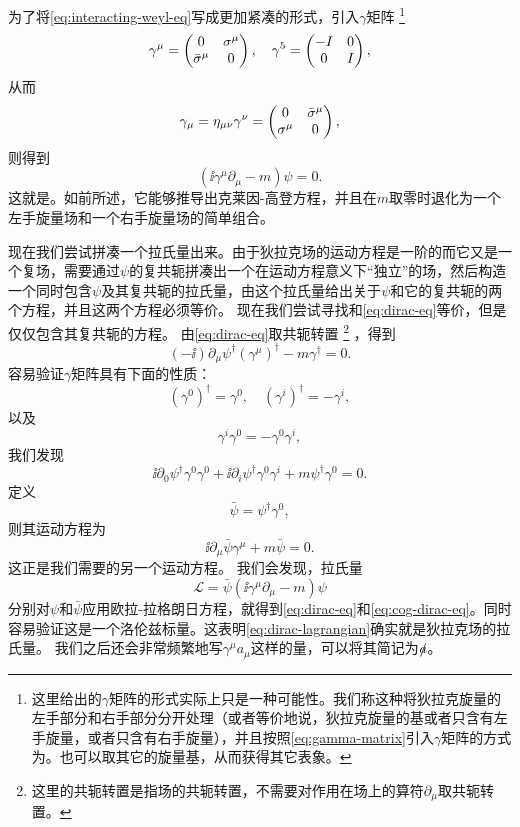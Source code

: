 为了将\eqref{eq:interacting-weyl-eq}写成更加紧凑的形式，引入$\gamma$矩阵%
\footnote{这里给出的$\gamma$矩阵的形式实际上只是一种可能性。我们称这种将狄拉克旋量的左手部分和右手部分分开处理（或者等价地说，狄拉克旋量的基或者只含有左手旋量，或者只含有右手旋量），并且按照\eqref{eq:gamma-matrix}引入$\gamma$矩阵的方式为。也可以取其它的旋量基，从而获得其它表象。}
\begin{equation}
    \gamma^\mu = \pmqty{0 & \sigma^\mu \\ \bar{\sigma}^\mu & 0}, \quad \gamma^5 = \pmqty{-I & 0 \\ 0 & I},
    \label{eq:gamma-matrix}
\end{equation}
从而
\begin{equation}
    \gamma_\mu = \eta_{\mu \nu} \gamma^\nu = \pmqty{ 0 & \bar{\sigma}^\mu \\ \sigma^\mu & 0 },
\end{equation}
则得到
\begin{equation}
    (\ii \gamma^\mu \partial_\mu - m) \psi = 0.
    \label{eq:dirac-eq}
\end{equation}
这就是。如前所述，它能够推导出克莱因-高登方程，并且在$m$取零时退化为一个左手旋量场和一个右手旋量场的简单组合。

现在我们尝试拼凑一个拉氏量出来。由于狄拉克场的运动方程是一阶的而它又是一个复场，需要通过$\psi$的复共轭拼凑出一个在运动方程意义下“独立”的场，然后构造一个同时包含$\psi$及其复共轭的拉氏量，由这个拉氏量给出关于$\psi$和它的复共轭的两个方程，并且这两个方程必须等价。
现在我们尝试寻找和\eqref{eq:dirac-eq}等价，但是仅仅包含其复共轭的方程。
由\eqref{eq:dirac-eq}取共轭转置%
\footnote{这里的共轭转置是指场的共轭转置，不需要对作用在场上的算符$\partial_\mu$取共轭转置。}
，得到
\[
    (-\ii) \partial_\mu \psi^\dagger (\gamma^\mu)^\dagger - m \gamma^\dagger = 0.
\]
容易验证$\gamma$矩阵具有下面的性质：
\[
    (\gamma^0)^\dagger = \gamma^0, \quad (\gamma^i)^\dagger = - \gamma^i, 
\]
以及
\[
    \gamma^i \gamma^0 = - \gamma^0 \gamma^i,
\]
我们发现
\[
    \ii \partial_0 \psi^\dagger \gamma^0 \gamma^0 + \ii \partial_i \psi^\dagger \gamma^0 \gamma^i + m \psi^\dagger \gamma^0 = 0.
\]
定义
\begin{equation}
    \bar{\psi} = \psi^\dagger \gamma^0,
\end{equation}
则其运动方程为
\begin{equation}
    \ii \partial_\mu \bar{\psi} \gamma^\mu + m \bar{\psi} = 0.
    \label{eq:cog-dirac-eq}
\end{equation}
这正是我们需要的另一个运动方程。
我们会发现，拉氏量
\begin{equation}
    \mathcal{L} = \bar{\psi} (\ii \gamma^\mu \partial_\mu - m) \psi
    \label{eq:dirac-lagrangian}
\end{equation}
分别对$\psi$和$\bar{\psi}$应用欧拉-拉格朗日方程，就得到\eqref{eq:dirac-eq}和\eqref{eq:cog-dirac-eq}。同时容易验证这是一个洛伦兹标量。这表明\eqref{eq:dirac-lagrangian}确实就是狄拉克场的拉氏量。
我们之后还会非常频繁地写$\gamma^\mu a_\mu$这样的量，可以将其简记为$\slashed{a}$。

